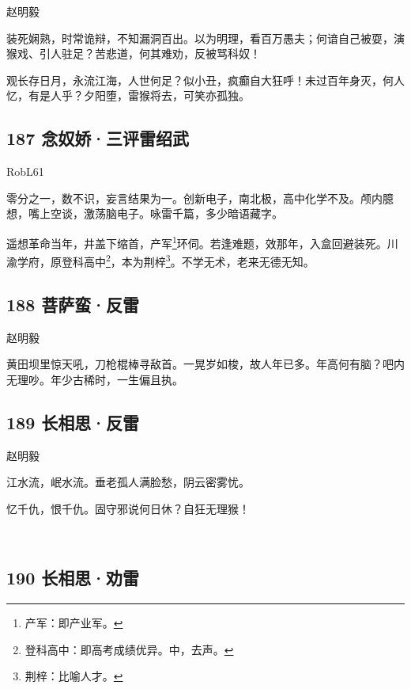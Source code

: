赵明毅

装死娴熟，时常诡辩，不知漏洞百出。以为明理，看百万愚夫；何谙自己被耍，演猴戏、引人驻足？苦悲道，何其难劝，反被骂科奴！

观长存日月，永流江海，人世何足？似小丑，疯癫自大狂呼！未过百年身灭，何人忆，有是人乎？夕阳堕，雷猴将去，可笑亦孤独。
~\\

\hypertarget{ux5ff5ux5974ux5a07ux4e09ux8bc4ux96f7ux7ecdux6b66}{%
\subsection{187
念奴娇·三评雷绍武}\label{ux5ff5ux5974ux5a07ux4e09ux8bc4ux96f7ux7ecdux6b66}}

RobL61

零分之一，数不识，妄言结果为一。创新电子，南北极，高中化学不及。颅内臆想，嘴上空谈，激荡脑电子。咏雷千篇，多少暗语藏字。

遥想革命当年，井盖下缩首，产军\footnote{产军：即产业军。}环伺。若逢难题，效那年，入盒回避装死。川渝学府，原登科高中\footnote{登科高中：即高考成绩优异。中，去声。}，本为荆梓\footnote{荆梓：比喻人才。}。不学无术，老来无德无知。

\hypertarget{ux83e9ux8428ux86eeux53cdux96f7}{%
\subsection{188 菩萨蛮·反雷}\label{ux83e9ux8428ux86eeux53cdux96f7}}

赵明毅

黄田坝里惊天吼，刀枪棍棒寻敌首。一晃岁如梭，故人年已多。年高何有脑？吧内无理吵。年少古稀时，一生偏且执。
~\\

\hypertarget{ux957fux76f8ux601dux53cdux96f7}{%
\subsection{189 长相思·反雷}\label{ux957fux76f8ux601dux53cdux96f7}}

赵明毅

江水流，岷水流。垂老孤人满脸愁，阴云密雾忧。

忆千仇，恨千仇。固守邪说何日休？自狂无理猴！

~\\

\hypertarget{ux957fux76f8ux601dux529dux96f7}{%
\subsection{190 长相思·劝雷}\label{ux957fux76f8ux601dux529dux96f7}}

